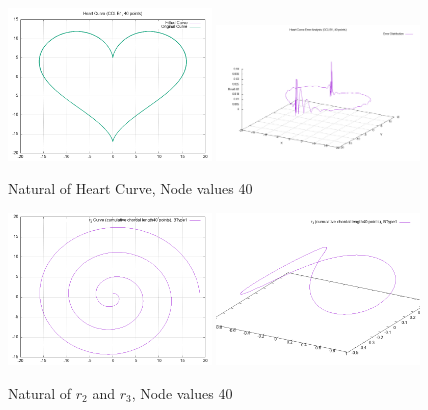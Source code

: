 \documentclass{article}
\begin{document}
\begin{figure}[H]
    \centering
    \includegraphics[width=0.48\textwidth]{../figure/B1CCLheartspline_plot_40.png}
    \includegraphics[width=0.48\textwidth]{../figure/B1CCLheartspline_error3d_40.png}
    \caption{Natural of Heart Curve, Node values 40}
\end{figure}

\begin{figure}[H]
    \centering
    \includegraphics[width=0.48\textwidth]{../figure/B1CCLr2spline_plot_40.png}
    \includegraphics[width=0.48\textwidth]{../figure/B1CCLr3spline_plot_40.png}
    \caption{Natural of \(r_2\) and \(r_3\), Node values 40}
\end{figure}
\end{document}
